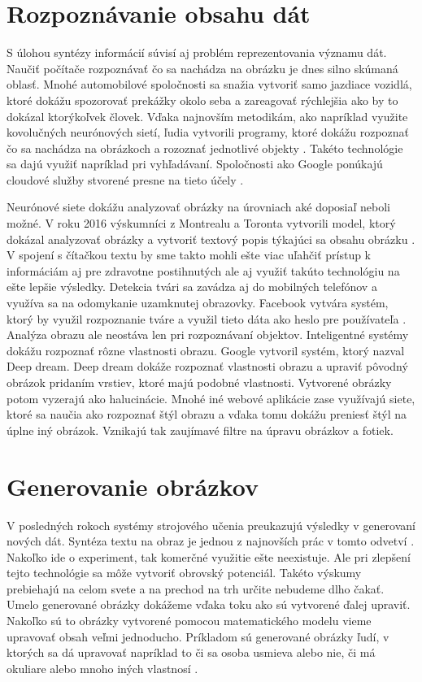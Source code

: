 \section{Rozpoznávanie obsahu dát}
S úlohou syntézy informácií súvisí aj problém reprezentovania významu dát.
Naučiť počítače rozpoznávať čo sa nachádza na obrázku je dnes silno skúmaná oblasť.
Mnohé automobilové spoločnosti sa snažia vytvoriť samo jazdiace vozidlá, ktoré dokážu spozorovať prekážky okolo seba a zareagovať rýchlejšia ako by to dokázal ktorýkoľvek človek.
Vďaka najnovším metodikám, ako napríklad využite kovolučných neurónových sietí,  ľudia vytvorili programy, ktoré dokážu rozpoznať čo sa nachádza na obrázkoch a rozoznať jednotlivé objekty \cite{tensorFlow}.
Takéto technológie sa dajú využiť napríklad pri vyhľadávaní. Spoločnosti ako Google ponúkajú cloudové služby stvorené presne na tieto účely \cite{googleCloud}.

Neurónové siete dokážu analyzovať obrázky na úrovniach aké doposiaľ neboli možné.
V roku 2016 výskumníci z Montrealu a Toronta vytvorili model, ktorý dokázal analyzovať obrázky a vytvoriť textový popis týkajúci sa obsahu obrázku \cite{imageCaption}.
V spojení s čítačkou textu by sme takto mohli ešte viac uľahčiť prístup k informáciám aj pre zdravotne postihnutých ale aj využiť takúto technológiu na ešte lepšie výsledky.
Detekcia tvári sa zavádza aj do mobilných telefónov a využíva sa na odomykanie uzamknutej obrazovky. Facebook vytvára systém, ktorý by využil rozpoznanie tváre a využil tieto dáta ako heslo pre používateľa \cite{facebook}.
Analýza obrazu ale neostáva len pri rozpoznávaní objektov. Inteligentné systémy dokážu rozpoznať rôzne vlastnosti obrazu.
Google vytvoril systém, ktorý nazval Deep dream. Deep dream dokáže rozpoznať vlastnosti obrazu a upraviť pôvodný obrázok pridaním vrstiev, ktoré majú podobné vlastnosti.
Vytvorené obrázky potom vyzerajú ako halucinácie.
Mnohé iné webové aplikácie zase využívajú siete, ktoré sa naučia ako rozpoznať štýl obrazu a vďaka tomu dokážu preniesť štýl na úplne iný obrázok. Vznikajú tak zaujímavé filtre na úpravu obrázkov a fotiek. 

\section{Generovanie obrázkov}
V posledných rokoch systémy strojového učenia preukazujú výsledky v generovaní nových dát.
Syntéza textu na obraz je jednou z najnovších prác v tomto odvetví \cite{text2image}.
Nakoľko ide o experiment, tak komerčné využitie ešte neexistuje. Ale pri zlepšení tejto technológie sa môže vytvoriť obrovský potenciál.
Takéto výskumy prebiehajú na celom svete a na prechod na trh určite nebudeme dlho čakať.
Umelo generované obrázky dokážeme vďaka toku ako sú vytvorené ďalej upraviť.
Nakoľko sú to obrázky vytvorené pomocou matematického modelu vieme upravovať obsah veľmi jednoducho.
Príkladom sú generované obrázky ľudí, v ktorých sa dá upravovať napríklad to či sa osoba usmieva alebo nie, či má okuliare alebo mnoho iných vlastnosí \cite{DCGAN}.
